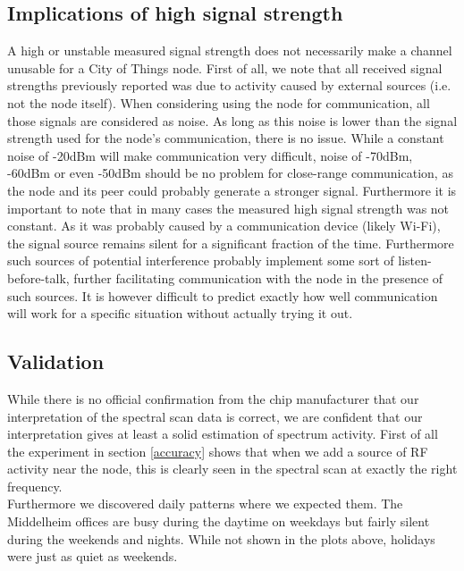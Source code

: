 \documentclass[a4paper, 11pt]{article}
\begin{document}
\subsection{Implications of high signal strength}
A high or unstable measured signal strength does not necessarily make a channel unusable for a City of Things node. First of all, we note that all received signal strengths previously reported was due to activity caused by external sources (i.e. not the node itself). When considering using the node for communication, all those signals are considered as noise. As long as this noise is lower than the signal strength used for the node's communication, there is no issue. While a constant noise of -20dBm will make communication very difficult, noise of -70dBm, -60dBm or even -50dBm should be no problem for close-range communication, as the node and its peer could probably generate a stronger signal. Furthermore it is important to note that in many cases the measured high signal strength was not constant. As it was probably caused by a communication device (likely Wi-Fi), the signal source remains silent for a significant fraction of the time. Furthermore such sources of potential interference probably implement some sort of listen-before-talk, further facilitating communication with the node in the presence of such sources. It is however difficult to predict exactly how well communication will work for a specific situation without actually trying it out.
\subsection{Validation}
While there is no official confirmation from the chip manufacturer that our interpretation of the spectral scan data is correct, we are confident that our interpretation gives at least a solid estimation of spectrum activity. First of all the experiment in section \ref{accuracy} shows that when we add a source of RF activity near the node, this is clearly seen in the spectral scan at exactly the right frequency. \\
Furthermore we discovered daily patterns where we expected them. The Middelheim offices are busy during the daytime on weekdays but fairly silent during the weekends and nights. While not shown in the plots above, holidays were just as quiet as weekends.
\end{document}
